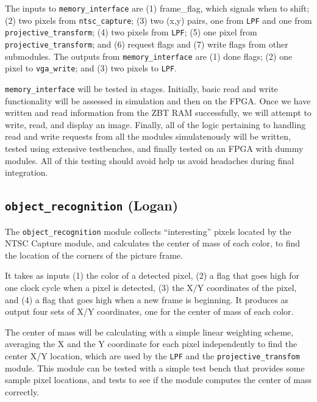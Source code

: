 \documentclass[10pt]{article}
\begin{document}
The inputs to {\tt memory\_interface} are (1) frame\_flag, which signals when to shift; (2) two pixels from {\tt ntsc\_capture}; (3) two (x,y) pairs, one from {\tt LPF} and one from {\tt projective\_transform}; (4) two pixels from {\tt LPF}; (5) one pixel from {\tt projective\_transform}; and (6) request flags and (7) write flags from other submodules. The outputs from {\tt memory\_interface} are (1) done flags; (2) one pixel to {\tt vga\_write}; and (3) two pixels to {\tt LPF}.

{\tt memory\_interface} will be tested in stages. Initially, basic read and write functionality will be assessed in simulation and then on the FPGA. Once we have written and read information from the ZBT RAM successfully, we will attempt to write, read, and display an image. Finally, all of the logic pertaining to handling read and write requests from all the modules simulatenously will be written, tested using extensive testbenches, and finally tested on an FPGA with dummy modules. All of this testing should avoid help us avoid headaches during final integration.

\subsection{{\tt object\_recognition} (Logan)}
The {\tt object\_recognition} module collects ``interesting'' pixels located by the NTSC Capture module, and calculates the center of mass of each color, to find the location of the corners of the picture frame.

It takes as inputs (1) the color of a detected pixel, (2) a flag that goes high for one clock cycle when a pixel is detected, (3) the X/Y coordinates of the pixel, and (4) a flag that goes high when a new frame is beginning. It produces as output four sets of X/Y coordinates, one for the center of mass of each color.

The center of mass will be calculating with a simple linear weighting scheme, averaging the X and the Y coordinate for each pixel independently to find the center X/Y location, which are used by the {\tt LPF} and the {\tt projective\_transfom} module. This module can be tested with a simple test bench that provides some sample pixel locations, and tests to see if the module computes the center of mass correctly.
\end{document}
